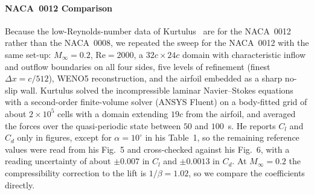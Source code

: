\newcommand{\TBD}{\textbf{[TBD]}}

\paragraph{NACA~0012 Comparison}
Because the low-Reynolds-number data of Kurtulus~\cite{Kurtulus2022criticalangle} are for the NACA~0012 rather than the NACA~0008, we repeated the sweep for the NACA~0012 with the same set-up: $M_\infty = 0.2$, $\mathrm{Re} = 2000$, a $32c\times24c$ domain with characteristic inflow and outflow boundaries on all four sides, five levels of refinement (finest $\Delta x = c/512$), WENO5 reconstruction, and the airfoil embedded as a sharp no-slip wall. Kurtulus solved the incompressible laminar Navier--Stokes equations with a second-order finite-volume solver (ANSYS Fluent) on a body-fitted grid of about $2\times10^{5}$ cells with a domain extending $19c$ from the airfoil, and averaged the forces over the quasi-periodic state between $50$ and $100$~s. He reports $C_l$ and $C_d$ only in figures, except for $\alpha = 10^{\circ}$ in his Table~1, so the remaining reference values were read from his Fig.~5 and cross-checked against his Fig.~6, with a reading uncertainty of about $\pm0.007$ in $C_l$ and $\pm0.0013$ in $C_d$. At $M_\infty = 0.2$ the compressibility correction to the lift is $1/\beta = 1.02$, so we compare the coefficients directly.

